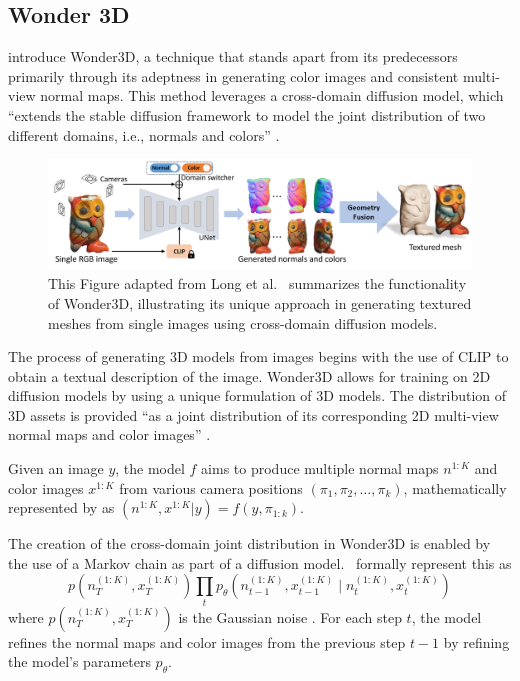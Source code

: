 \subsection{Wonder 3D}\label{Wonder3D}

\citeauthor{long2023wonder3d} introduce Wonder3D, a technique that stands apart from its predecessors primarily through its adeptness in generating color images and consistent multi-view normal maps. This method leverages a cross-domain diffusion model, which ``extends the stable diffusion framework to model the joint distribution of two different domains, i.e., normals and colors'' \citep{long2023wonder3d}.


\begin{figure}[ht]
  \centering
    \includegraphics[width=1\columnwidth]{figures/models/Wonder3D.png}
    \caption{This Figure adapted from Long et al.~\citep{long2023wonder3d} summarizes the functionality of Wonder3D, illustrating its unique approach in generating textured meshes from single images using cross-domain diffusion models.}\label{fig:Wonder3D}
\end{figure}

The process of generating 3D models from images begins with the use of CLIP \citep{radfordCLIP} to obtain a textual description of the image. Wonder3D allows for training on 2D diffusion models by using a unique formulation of 3D models. The distribution of 3D assets is provided ``as a joint distribution of its corresponding 2D multi-view normal maps and color images'' \citep{long2023wonder3d}. 

Given an image \( y \), the model \(f\) aims to produce multiple normal maps \( n^{1:K} \) and color images \( x^{1:K} \) from various camera positions \((\pi_1, \pi_2, \ldots, \pi_k)\), mathematically represented by \citeauthor{long2023wonder3d} as \((n^{1:K}, x^{1:K} | y) = f(y, \pi_{1:k})\).

The creation of the cross-domain joint distribution in Wonder3D is enabled by the use of a Markov chain as part of a diffusion model.~\citeauthor{long2023wonder3d} formally represent this as \[ p\left(n_T^{(1: K)}, x_T^{(1: K)}\right) \prod_t p_\theta\left(n_{t-1}^{(1: K)}, x_{t-1}^{(1: K)} \mid n_t^{(1: K)}, x_t^{(1: K)}\right) \] where \( p\left(n_T^{(1: K)}, x_T^{(1: K)}\right) \) is the Gaussian noise \citep{long2023wonder3d}. For each step \(t\), the model refines the normal maps and color images from the previous step \(t-1\) by refining the model's parameters \(p_\theta\).

